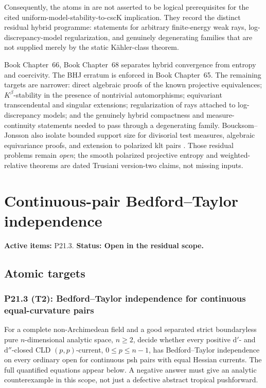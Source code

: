\documentclass[11pt,a4paper]{article}
\theoremstyle{definition}
\theoremstyle{remark}
\newcommand{\rd}{\mathrm d}
\newcommand{\dprime}{\rd'}
\newcommand{\ddprime}{\rd''}
\begin{document}
Consequently, the atoms in  are not asserted
to be logical prerequisites for the cited uniform-model-stability-to-cscK
implication.  They record the distinct residual hybrid programme: statements
for arbitrary finite-energy weak rays, log-discrepancy-model regularization,
and genuinely degenerating families that are not supplied merely by the
static Kähler-class theorem.

Book Chapter~66, Book Chapter~68 separates hybrid convergence from
entropy and coercivity.  The BHJ erratum is enforced in
Book Chapter~65.  The remaining targets are narrower: direct
algebraic proofs of the known projective equivalences; \(K^\beta\)-stability
in the presence of nontrivial automorphisms; equivariant transcendental and
singular extensions; regularization of rays attached to log-discrepancy
models; and the genuinely hybrid compactness and measure-continuity
statements needed to pass through a degenerating family.  Boucksom--Jonsson
also isolate bounded support size for divisorial test measures, algebraic
equivariance proofs, and extension to polarized klt pairs
\cite[Questions and further remarks]{BJ25WeightedYTD}.  Those residual
problems remain \emph{open}; the smooth polarized projective entropy and
weighted-relative theorems are dated Trusiani version-two claims, not
missing inputs.

\clearpage\section{Continuous-pair Bedford--Taylor independence}
\label{family:12}
\noindent\textbf{Active items:} P21.3. \textbf{Status: Open in the residual scope.}

\subsection{Atomic targets}
\subsubsection*{P21.3 (T2): Bedford--Taylor independence for continuous equal-curvature pairs}
\label{atom:P21.3}
For a complete non-Archimedean field and a good separated strict boundaryless pure \(n\)-dimensional analytic space, \(n\ge2\), decide whether every positive \(\dprime\)- and \(\ddprime\)-closed CLD \((p,p)\)-current, \(0\le p\le n-1\), has Bedford--Taylor independence on every ordinary open for continuous psh pairs with equal Hessian currents. The full quantified equations appear below. A negative answer must give an analytic counterexample in this scope, not just a defective abstract tropical pushforward.
\end{document}
